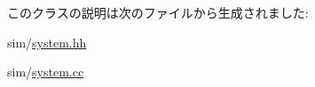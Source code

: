 このクラスの説明は次のファイルから生成されました:\begin{DoxyCompactItemize}
\item 
sim/\hyperlink{sim_2system_8hh}{system.hh}\item 
sim/\hyperlink{sim_2system_8cc}{system.cc}\end{DoxyCompactItemize}

